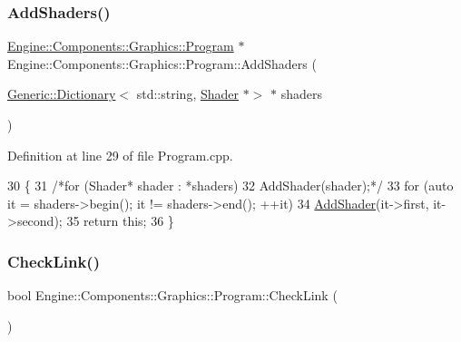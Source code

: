 \subsubsection{\texorpdfstring{Add\+Shaders()}{AddShaders()}}
{\footnotesize\ttfamily \mbox{\hyperlink{classEngine_1_1Components_1_1Graphics_1_1Program}{Engine\+::\+Components\+::\+Graphics\+::\+Program}} $\ast$ Engine\+::\+Components\+::\+Graphics\+::\+Program\+::\+Add\+Shaders (\begin{DoxyParamCaption}\item[{\mbox{\hyperlink{classGeneric_1_1Dictionary}{Generic\+::\+Dictionary}}$<$ std\+::string, \mbox{\hyperlink{classEngine_1_1Components_1_1Graphics_1_1Shader}{Shader}} $\ast$$>$ $\ast$}]{shaders }\end{DoxyParamCaption})}



Definition at line 29 of file Program.\+cpp.


\begin{DoxyCode}
30 \{
31     \textcolor{comment}{/*for (Shader* shader : *shaders)}
32 \textcolor{comment}{        AddShader(shader);*/}
33     \textcolor{keywordflow}{for} (\textcolor{keyword}{auto} it = shaders->begin(); it != shaders->end(); ++it)
34         \mbox{\hyperlink{classEngine_1_1Components_1_1Graphics_1_1Program_a95af201a6fab77be50b5fdefbf3bbe63}{AddShader}}(it->first, it->second);
35     \textcolor{keywordflow}{return} \textcolor{keyword}{this};
36 \}
\end{DoxyCode}
\mbox{\label{classEngine_1_1Components_1_1Graphics_1_1Program_a1f4c378d3e4663b0a41bb0c2ad4ace3f}} 
\subsubsection{\texorpdfstring{Check\+Link()}{CheckLink()}}
{\footnotesize\ttfamily bool Engine\+::\+Components\+::\+Graphics\+::\+Program\+::\+Check\+Link (\begin{DoxyParamCaption}{ }\end{DoxyParamCaption})\hspace{0.3cm}{\ttfamily [private]}}




